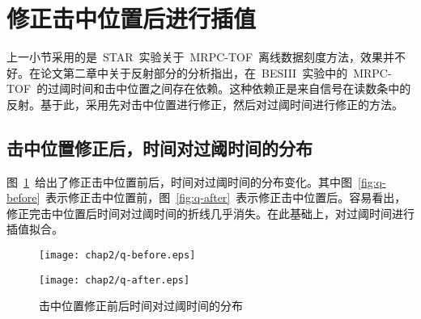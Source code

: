 \begin{comment}

\subsection{反射问题}
图~\ref{fig:TOT}~是信号的过阈时间。对于一定的阈值，幅度大小不同的信号，对应的过阈时间不同。信号幅度越大，过阈时间也就越大。
图~\ref{fig:reflection}~是~MRPC~读数条的反射问题，分为近端反射和远端反射。由于读数条本身较短，反射信号只是比真实信号时间晚不到1ns，这样导致反射信号和原来的真实信号叠加。测量的过阈时间也就变大了。
正是由于过阈问题和反射问题的存在，导致时间对过阈时间的分布复杂。对时间和过阈时间的关系的研究也刻度研究的重点和难点部分。

\begin{figure}[!h]
\begin{minipage}[!h]{0.5\linewidth}
\texttt{[image: chap2/TOT.png]}
\subcaption{过阈时间~\cite{Shao:2009aa}~}
\label{fig:TOT}
\end{minipage}
\hfill
\begin{minipage}[!h]{0.5\linewidth}
\texttt{[image: chap2/reflection.png]}
\subcaption{反射问题}
\label{fig:reflection}
\end{minipage}%
\caption{反射问题和过阈时间}
\end{figure}

\end{comment}
\section{修正击中位置后进行插值}
上一小节采用的是~STAR~实验关于~MRPC-TOF~离线数据刻度方法，效果并不好。在论文第二章中关于反射部分的分析指出，在~BESIII~实验中的~MRPC-TOF~的过阈时间和击中位置之间存在依赖。这种依赖正是来自信号在读数条中的反射。基于此，采用先对击中位置进行修正，然后对过阈时间进行修正的方法。
\subsection{击中位置修正后，时间对过阈时间的分布}
图~\ref{fig:t2q}~给出了修正击中位置前后，时间对过阈时间的分布变化。其中图~\ref{fig:q-before}~表示修正击中位置前，图~\ref{fig:q-after}~表示修正击中位置后。容易看出，修正完击中位置后时间对过阈时间的折线几乎消失。在此基础上，对过阈时间进行插值拟合。
\begin{figure}[!h]
\begin{minipage}[!h]{0.5\linewidth}
\texttt{[image: chap2/q-before.eps]}
\label{fig:q-before}
\end{minipage}%
\hfill
\begin{minipage}[!h]{0.5\linewidth}
\texttt{[image: chap2/q-after.eps]}
\label{fig:q-after}
\end{minipage}
\caption{击中位置修正前后时间对过阈时间的分布}
\label{fig:t2q}
\end{figure}

